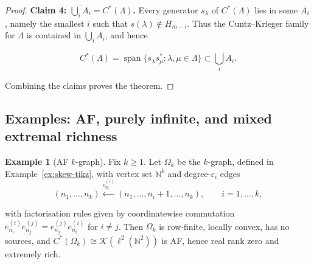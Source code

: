 \documentclass[12pt]{amsart}
\theoremstyle{plain}
\theoremstyle{definition}
\newtheorem{example}[theorem]{Example}
\theoremstyle{remark}
\begin{document}
\begin{proof}
\smallskip

\textbf{Claim 4: $\overline{\bigcup_i A_i} = C^*(\Lambda)$.}
Every generator $s_\lambda$ of $C^*(\Lambda)$ lies in some
$A_i$, namely the smallest $i$ such that $s(\lambda)\notin H_{m-i}$.
Thus the Cuntz--Krieger family for $\Lambda$ is contained in
$\bigcup_i A_i$, and hence


\[
C^*(\Lambda) = \overline{\operatorname{span}}
\{ s_\lambda s_\mu^* : \lambda,\mu\in\Lambda\}
\subset \overline{\bigcup_i A_i}.
\]



\smallskip

Combining the claims proves the theorem.
\end{proof}

\subsection{Examples: AF, purely infinite, and mixed extremal richness}

\begin{example}[AF $k$-graph]\label{ex:AF-kgraph}
Fix $k\ge 1$. Let $\Omega_k$ be the $k$-graph, defined in
Example~\ref{ex:skew-tikz}, with
vertex set $\mathbb N^k$ and degree-$\varepsilon_i$
edges
\[
(n_1,\dots,n_k) \xleftarrow{e^{(i)}_{n_i}} (n_1,\dots,n_i+1,\dots,n_k),
\qquad i=1,\dots,k,
\]

\noindent
with factorisation rules given by coordinatewise commutation
$e^{(i)}_{n_i} e^{(j)}_{n_j} = e^{(j)}_{n_j} e^{(i)}_{n_i}$ for $i\neq j$.
Then $\Omega_k$ is row-finite, locally convex, has no
sources, and $C^*(\Omega_k) \cong \mathcal{K} ( \ell^2 ( \mathbb{N}^2 ))$ is AF, hence real rank zero
and extremely rich.
\end{example}

\end{document}
